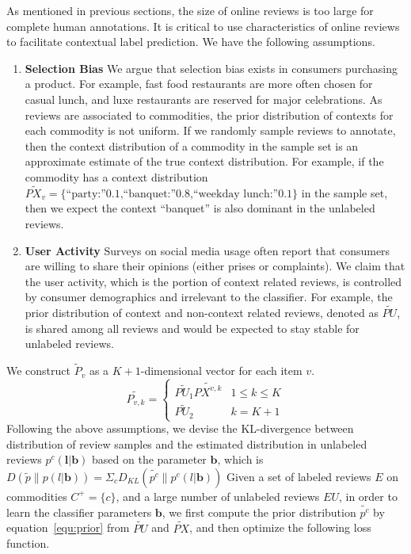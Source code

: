 \documentclass[sigconf]{acmart}
\begin{document}
As mentioned in previous sections, the size of online reviews is too large for complete human annotations. It is critical to use characteristics of online reviews to facilitate contextual label prediction. We have the following assumptions.
\begin{enumerate}
  \item \textbf{Selection Bias} We argue that selection bias exists in consumers purchasing a product. For example, fast food restaurants are more often chosen for casual lunch, and luxe restaurants are reserved for major celebrations. As reviews are associated to commodities, the prior distribution of contexts for each commodity is not uniform. If we randomly sample reviews to annotate, then the context distribution of a commodity in the sample set is an approximate estimate of the true context distribution. For example, if the commodity has a context distribution $\tilde{PX_v}=\{\textrm{``party:''0.1,``banquet:''0.8,``weekday lunch:''0.1}\}$ in the sample set, then we expect the context ``banquet'' is also dominant in the unlabeled reviews.
  \item \textbf{User Activity} Surveys on social media usage often report that consumers are willing to share their opinions (either prises or complaints). We claim that the user activity, which is the portion of context related reviews, is controlled by consumer demographics and irrelevant to the classifier. For example, the prior distribution of context and non-context related reviews, denoted as $\tilde{PU}$, is shared among all reviews and would be expected to stay stable for unlabeled reviews. 
\end{enumerate}
We construct $\tilde{P}_v$ as a $K+1$-dimensional vector for each item $v$.
\begin{equation}\label{equ:prior}
\tilde{P_{v,k}}=
\left\{
\begin{array}{cc}
\tilde{PU_1} \tilde{PX^{v,k}}& 1\leq k\leq K\\
\tilde{PU_2} &  k = K+1
\end{array} \right.
\end{equation}
Following the above assumptions, we devise the KL-divergence between distribution of review samples and the estimated distribution in unlabeled reviews $p^c(\mathbf{l}|\mathbf{b})$ based on the parameter $\mathbf{b}$, which is $D(\tilde{p}\|p(l|\mathbf{b}))\!=\!\Sigma_{c}D_{KL}(\tilde{p^c}\|p^c(l|\mathbf{b}))$
Given a set of labeled reviews $E$ on commodities $C^+=\{c\}$, and a large number of unlabeled reviews $EU$, in order to learn the classifier parameters $\mathbf{b}$, we first compute the prior distribution $\tilde{p^c}$ by equation~\ref{equ:prior} from $\tilde{PU}$ and $\tilde{PX}$, and then optimize the following loss function.
\end{document}
